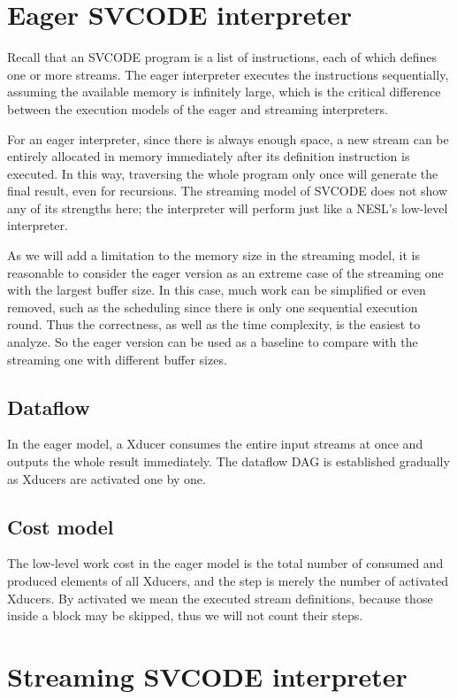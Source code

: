\section{Eager SVCODE interpreter}
Recall that an SVCODE program is a list of instructions, each of which defines one or more streams. 
The eager interpreter executes the instructions sequentially, assuming the available memory is infinitely large, which is the critical difference between the execution models of the eager and streaming interpreters.

For an eager interpreter, since there is always enough space, a  new stream can be entirely allocated in memory immediately after its definition instruction is executed.
In this way, traversing the whole program only once will generate the final result, even for recursions.
The streaming model of SVCODE does not show any of its strengths here; the interpreter will perform just like a NESL's low-level interpreter. 


As we will add a limitation to the memory size in the streaming model, it is reasonable to consider the eager version as an extreme case  of the streaming one with the largest buffer size. 
In this case, much work can be simplified or even removed, such as the scheduling since there is only one sequential execution round. 
Thus the correctness, as well as the time complexity, is the easiest to analyze. 
So the eager version can be used as a baseline to compare with the streaming one with different buffer sizes.


\subsection{Dataflow}
In the eager model, a Xducer consumes the entire input streams at once and outputs the whole result immediately. 
The dataflow DAG is established gradually as Xducers are activated one by one.   


\subsection{Cost model}
The low-level work cost in the eager model is the total number of consumed and produced elements of all Xducers, and the step is merely the number of activated Xducers. 
By activated we mean the executed stream definitions, because those inside a \wc block may be skipped, thus we will not count their steps. 



\section{Streaming SVCODE interpreter}

